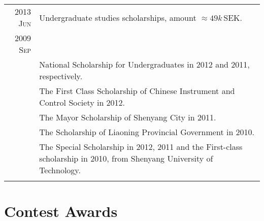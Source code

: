 \documentclass[a4paper,10pt]{article}
\begin{document}
\begin{savenotes}
\begin{longtable}{r|p{13cm}}
    \textsc{2013 Jun}	& Undergraduate studies scholarships, amount $\approx 49k\,\mathrm {SEK}$.\\
    \textsc{2009 Sep}	& \\
                      & National Scholarship for Undergraduates in 2012 and 2011, respectively.\\
                      & The First Class Scholarship of Chinese Instrument and Control Society in 2012.\\
                      & The Mayor Scholarship of Shenyang City in 2011.\\
                      & The Scholarship of Liaoning Provincial Government in 2010.\\
                      & The Special Scholarship in 2012, 2011 and the First-class scholarship in 2010, from Shenyang University of Technology.\\
    \multicolumn{2}{c}{} \\

  \end{longtable}
\end{savenotes}

\section{Contest Awards}
\end{document}
